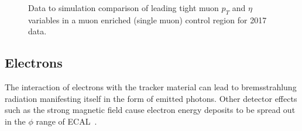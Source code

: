 \begin{figure}[htbp]
    \begin{center}
        \caption{Data to simulation comparison of leading tight muon $p_T$ and $\eta$ variables in a muon enriched (single muon) control region for 2017 data.}
        \label{fig:obj_muon}
    \end{center}
  \end{figure}

\subsection{Electrons}
\label{subsec:electrons}
\hspace{10pt} The interaction of electrons with the tracker material can lead to bremsstrahlung radiation manifesting itself in the form of emitted photons. Other detector effects such as the strong magnetic field cause electron energy deposits to be spread out in the $\phi$ range of ECAL~\cite{paper:pf_muon_1,note_ele_reco,twiki_egamma_1}. %

